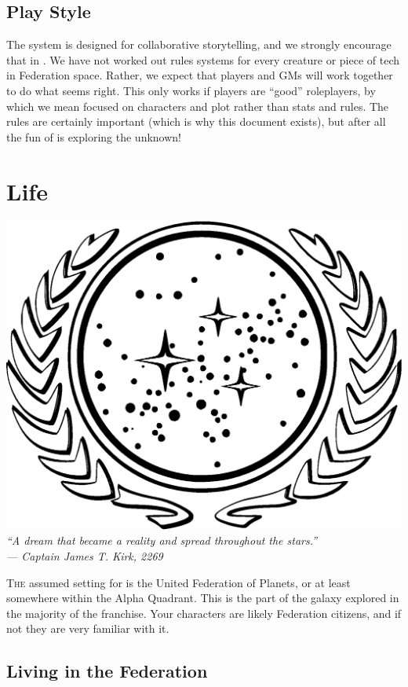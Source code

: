 \documentclass[12pt,titlepage,openany]{book}
\begin{document}
\section{Play Style}

The \FateCore{} system is designed for collaborative storytelling, and we
strongly encourage that in \StarTrekFate{}. We have not worked out rules
systems for every creature or piece of tech in Federation space. Rather, we
expect that players and GMs will work together to do what seems right. This
only works if players are ``good'' roleplayers, by which we mean focused on
characters and plot rather than stats and rules. The rules are certainly
important (which is why this document exists), but after all the fun of
\StarTrek{} is exploring the unknown!



\chapter{\StarTrek{} Life}\label{chap:life}

\begin{center}
    \includegraphics[width=0.5\linewidth]{img/Federation.eps}\\
    \vspace{2ex}
    \textit{``A dream that became a reality and spread throughout the
    stars.''\\ --- Captain James T. Kirk, 2269}
\end{center}

\noindent \lettrine[lines=1]{T}{he} assumed setting for \StarTrekFate{} is the
United Federation of Planets, or at least somewhere within the Alpha Quadrant.
This is the part of the galaxy explored in the majority of the \StarTrek{}
franchise. Your characters are likely Federation citizens, and if not they are
very familiar with it.

\section{Living in the Federation}
\end{document}
